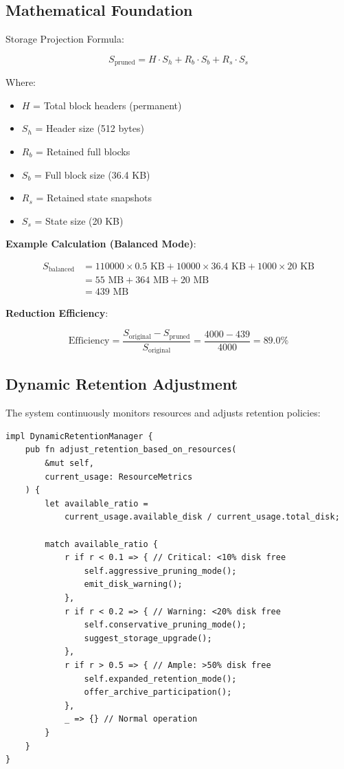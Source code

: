 \documentclass[11pt,a4paper]{article}
\begin{document}
\subsection{Mathematical Foundation}

Storage Projection Formula:

\begin{equation}
S_{\text{pruned}} = H \cdot S_h + R_b \cdot S_b + R_s \cdot S_s
\end{equation}

Where:
\begin{itemize}
\item $H$ = Total block headers (permanent)
\item $S_h$ = Header size (512 bytes)
\item $R_b$ = Retained full blocks
\item $S_b$ = Full block size (36.4 KB)
\item $R_s$ = Retained state snapshots
\item $S_s$ = State size (20 KB)
\end{itemize}

\textbf{Example Calculation (Balanced Mode)}:

\begin{align}
S_{\text{balanced}} &= 110000 \times 0.5\text{ KB} + 10000 \times 36.4\text{ KB} + 1000 \times 20\text{ KB} \\
&= 55\text{ MB} + 364\text{ MB} + 20\text{ MB} \\
&= 439\text{ MB}
\end{align}

\textbf{Reduction Efficiency}:

\begin{equation}
\text{Efficiency} = \frac{S_{\text{original}} - S_{\text{pruned}}}{S_{\text{original}}} = \frac{4000 - 439}{4000} = 89.0\%
\end{equation}

\subsection{Dynamic Retention Adjustment}

The system continuously monitors resources and adjusts retention policies:

\begin{lstlisting}
impl DynamicRetentionManager {
    pub fn adjust_retention_based_on_resources(
        &mut self,
        current_usage: ResourceMetrics
    ) {
        let available_ratio =
            current_usage.available_disk / current_usage.total_disk;

        match available_ratio {
            r if r < 0.1 => { // Critical: <10% disk free
                self.aggressive_pruning_mode();
                emit_disk_warning();
            },
            r if r < 0.2 => { // Warning: <20% disk free
                self.conservative_pruning_mode();
                suggest_storage_upgrade();
            },
            r if r > 0.5 => { // Ample: >50% disk free
                self.expanded_retention_mode();
                offer_archive_participation();
            },
            _ => {} // Normal operation
        }
    }
}
\end{lstlisting}
\end{document}
